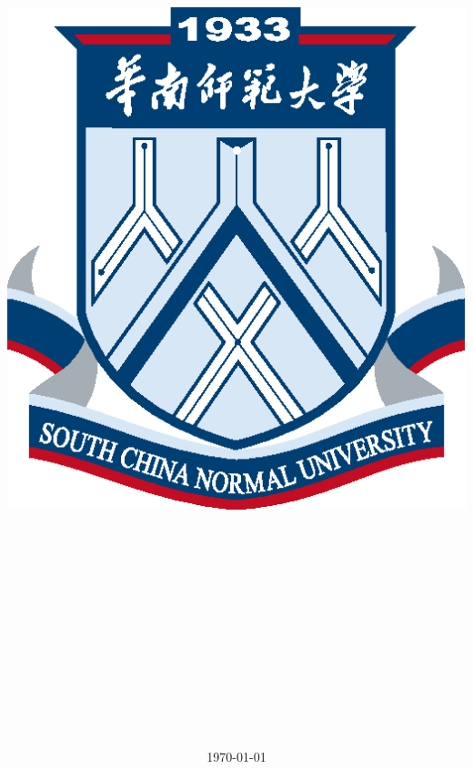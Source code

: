 \documentclass{article}
\title{
	\thispagestyle{empty}
	\includegraphics[scale = 0.5]{SCNU_logo.eps}\\
	\vspace{1in}
	\textmd{\textbf{\hmwkClass\ }}\\
    \textmd{\textbf{\hmwkSubTitle}}\\
	\vspace{0.1in}\large{\textit{\hmwkClassInstructor\ }}\\
			\vspace{3in}
	\hmwMajor{}\\
	\hmwNumber{}\\
	\hmwkAuthorName{}\\
}
\date{\today}
\begin{document}
\begin{sloppypar}

	\begin{titlepage}
		\clearpage\maketitle
		\thispagestyle{empty}
	\end{titlepage}
	\setlength{\parindent}{2em}
	\pagebreak

	\tableofcontents
	
	\pagebreak

	

	
\end{sloppypar}
\end{document}
